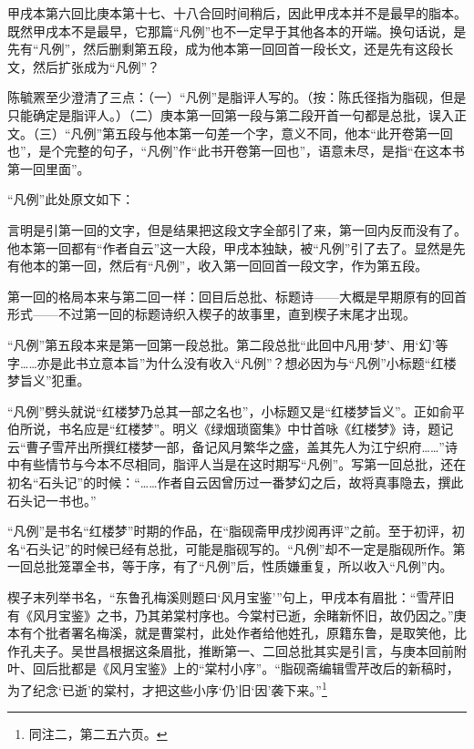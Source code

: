 \par 甲戌本第六回比庚本第十七、十八合回时间稍后，因此甲戌本并不是最早的脂本。既然甲戌本不是最早，它那篇“凡例”也不一定早于其他各本的开端。换句话说，是先有“凡例”，然后删剩第五段，成为他本第一回回首一段长文，还是先有这段长文，然后扩张成为“凡例”？
\par 陈毓罴至少澄清了三点：（一）“凡例”是脂评人写的。（按：陈氏径指为脂砚，但是只能确定是脂评人。）（二）庚本第一回第一段与第二段开首一句都是总批，误入正文。（三）“凡例”第五段与他本第一句差一个字，意义不同，他本“此开卷第一回也”，是个完整的句子，“凡例”作“此书开卷第一回也”，语意未尽，是指“在这本书第一回里面”。
\par “凡例”此处原文如下：
\par 言明是引第一回的文字，但是结果把这段文字全部引了来，第一回内反而没有了。他本第一回都有“作者自云”这一大段，甲戌本独缺，被“凡例”引了去了。显然是先有他本的第一回，然后有“凡例”，收入第一回回首一段文字，作为第五段。
\par 第一回的格局本来与第二回一样：回目后总批、标题诗——大概是早期原有的回首形式——不过第一回的标题诗织入楔子的故事里，直到楔子末尾才出现。
\par “凡例”第五段本来是第一回第一段总批。第二段总批“此回中凡用‘梦’、用‘幻’等字……亦是此书立意本旨”为什么没有收入“凡例”？想必因为与“凡例”小标题“红楼梦旨义”犯重。
\par “凡例”劈头就说“红楼梦乃总其一部之名也”，小标题又是“红楼梦旨义”。正如俞平伯所说，书名应是“红楼梦”。明义《绿烟琐窗集》中廿首咏《红楼梦》诗，题记云“曹子雪芹出所撰红楼梦一部，备记风月繁华之盛，盖其先人为江宁织府……”诗中有些情节与今本不尽相同，脂评人当是在这时期写“凡例”。写第一回总批，还在初名“石头记”的时候：“……作者自云因曾历过一番梦幻之后，故将真事隐去，撰此石头记一书也。”
\par “凡例”是书名“红楼梦”时期的作品，在“脂砚斋甲戌抄阅再评”之前。至于初评，初名“石头记”的时候已经有总批，可能是脂砚写的。“凡例”却不一定是脂砚所作。第一回总批笼罩全书，等于序，有了“凡例”后，性质嫌重复，所以收入“凡例”内。
\par 楔子末列举书名，“东鲁孔梅溪则题曰‘风月宝鉴’”句上，甲戌本有眉批：“雪芹旧有《风月宝鉴》之书，乃其弟棠村序也。今棠村已逝，余睹新怀旧，故仍因之。”庚本有个批者署名梅溪，就是曹棠村，此处作者给他姓孔，原籍东鲁，是取笑他，比作孔夫子。吴世昌根据这条眉批，推断第一、二回总批其实是引言，与庚本回前附叶、回后批都是《风月宝鉴》上的“棠村小序”。“脂砚斋编辑雪芹改后的新稿时，为了纪念‘已逝’的棠村，才把这些小序‘仍’旧‘因’袭下来。”\footnote{同注二，第二五六页。}
